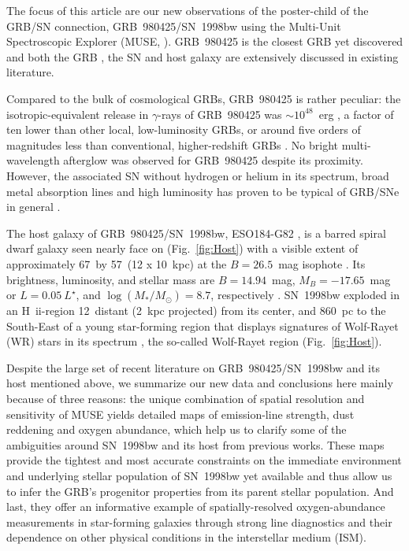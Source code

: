 \documentclass[traditabstract, referee]{aa}
\newcommand{\hii}{\mbox{H~{\sc ii}}}
\begin{document}
The focus of this article are our new observations of the poster-child of the GRB/SN connection, GRB~980425/SN~1998bw using the Multi-Unit Spectroscopic Explorer (MUSE, \citealp{2010SPIE.7735E..08B}). GRB~980425 is the closest GRB yet discovered and both the GRB \citep[e.g.][]{1998Natur.395..670G, 1998Natur.395..663K}, the SN \citep[e.g.][]{1998Natur.395..672I, 2001ApJ...555..900P, 2006ApJ...640..854M} and host galaxy \citep[e.g.][]{2000ApJ...542L..89F, 2005NewA...11..103S, 2006A&A...454..103H, 2009ApJ...693..347M, 2014A&A...562A..70M, 2016arXiv160901742M, 2012ApJ...746....7L, 2015MNRAS.454L..51A} are extensively discussed in existing literature. 

Compared to the bulk of cosmological GRBs, GRB~980425 is rather peculiar: the isotropic-equivalent release in $\gamma$-rays of GRB~980425 was $\sim10^{48}$~erg \citep{1998Natur.395..670G}, a factor of ten lower than other local, low-luminosity GRBs, or around five orders of magnitudes less than conventional, higher-redshift GRBs \citep{2013ApJ...776...98X}. No bright multi-wavelength afterglow was observed for GRB~980425 despite its proximity. However, the associated SN without hydrogen or helium in its spectrum, broad metal absorption lines and high luminosity has proven to be typical of GRB/SNe in general \citep{2012grbu.book..169H}.

The host galaxy of GRB~980425/SN~1998bw, ESO184-G82 \citep{1989spce.book.....L}, is a barred spiral dwarf galaxy \citep{2000ApJ...542L..89F} seen nearly face on (Fig.~\ref{fig:Host}) with a visible {extent} of approximately 67\arcsec~by 57\arcsec~(12 x 10~kpc) at the $B=26.5$~mag isophote \citep{2005NewA...11..103S}. Its brightness, luminosity, and stellar mass are $B=14.94$~mag, $M_B=-17.65$~mag or $L=0.05~{L}^{\star}$, and $\log (M_{*}/M_{\odot})= 8.7 $, respectively \citep{2005NewA...11..103S, 2014A&A...562A..70M}. SN~1998bw exploded in an \hii-region 12\arcsec~distant (2~kpc projected) from its center, and 860~pc to the South-East of a young star-forming region that displays signatures of Wolf-Rayet (WR) stars in its spectrum \citep{2006A&A...454..103H}, the so-called Wolf-Rayet region (Fig.~\ref{fig:Host}).

Despite the large set of recent literature on GRB~980425/SN~1998bw and its host mentioned above, we summarize our new data and conclusions here mainly because of three reasons: the unique combination of spatial resolution and sensitivity of MUSE yields detailed maps of emission-line strength, dust reddening and oxygen abundance, which help us to clarify some of the ambiguities around SN~1998bw and its host from previous works. These maps provide the tightest and most accurate constraints on the immediate environment and underlying stellar population of SN~1998bw yet available and thus allow us to infer the GRB's progenitor properties from its parent stellar population. And last, they offer an informative example of spatially-resolved oxygen-abundance measurements in star-forming galaxies through strong line diagnostics and their dependence on other physical conditions in the interstellar medium (ISM).
\end{document}
